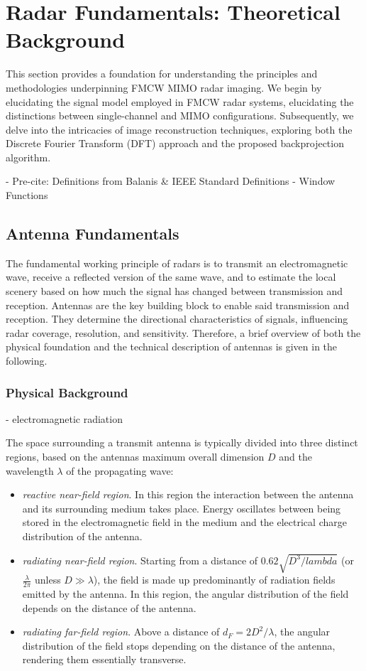 \chapter{Radar Fundamentals: Theoretical Background}
This section provides a foundation for understanding the principles and methodologies underpinning FMCW MIMO radar imaging.
We begin by elucidating the signal model employed in FMCW radar systems, 
elucidating the distinctions between single-channel and MIMO configurations.
Subsequently, we delve into the intricacies of image reconstruction techniques,
exploring both the Discrete Fourier Transform (DFT) approach and the proposed backprojection algorithm.

- Pre-cite: Definitions from Balanis & IEEE Standard Definitions
- Window Functions
\section{Antenna Fundamentals}

The fundamental working principle of radars is to transmit an electromagnetic wave,
receive a reflected version of the same wave, 
and to estimate the local scenery based on how much the signal has changed between transmission and reception.
Antennas are the key building block to enable said transmission and reception.
They determine the directional characteristics of signals,
influencing radar coverage, resolution, and sensitivity.
Therefore, a brief overview of both the physical foundation 
and the technical description of antennas is given in the following.

\subsection{Physical Background}
 
- electromagnetic radiation


The space surrounding a transmit antenna is typically divided into three distinct regions,
based on the antennas maximum overall dimension $D$ and the wavelength $\lambda$ of the propagating wave: 
\begin{itemize}
    \item \emph{reactive near-field region}.
    In this region the interaction between the antenna and its surrounding medium takes place.
    Energy oscillates between being stored in the electromagnetic field in the medium 
    and the electrical charge distribution of the antenna.
    
    \item \emph{radiating near-field region}.
    Starting from a distance of $0.62\sqrt{D^3/lambda}$ (or $\frac{\lambda}{2\pi}$ unless $D\gg\lambda$),
    the field is made up predominantly of radiation fields emitted by the antenna.
    In this region, the angular distribution of the field depends on the distance of the antenna.

    \item \emph{radiating far-field region}.
    Above a distance of $d_F = 2D^2/\lambda$,
    the angular distribution of the field stops depending on the distance of the antenna,
    rendering them essentially transverse.
\end{itemize}

